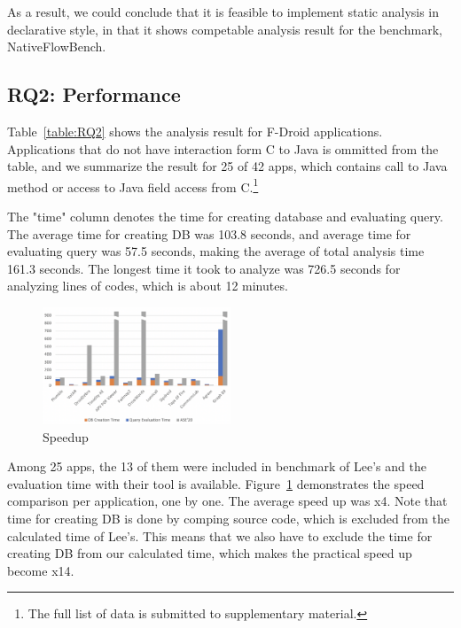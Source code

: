 As a result, we could conclude that it is feasible to implement static analysis
in declarative style, in that it shows competable analysis result for the
benchmark, NativeFlowBench.


\subsection{RQ2: Performance}

Table~\ref{table:RQ2} shows the analysis result for F-Droid applications.
Applications that do not have interaction form C to Java is ommitted from the
table, and we summarize the result for 25 of 42 apps, which contains call to
Java method or access to Java field access from C.\footnote{The full list of data
is submitted to supplementary material.}

The "time" column denotes the time for creating database and evaluating query.
The average time for creating DB was 103.8 seconds, and average time for
evaluating query was 57.5 seconds, making the average of total analysis time
161.3 seconds. The longest time it took to analyze was 726.5 seconds for
analyzing  lines of codes, which is about 12 minutes.

\begin{figure}[t]
  \centering
  \vspace{2mm}
  \includegraphics[width=0.5\textwidth]{img/graph}
  \vspace*{-1.5em}
  \caption{Speedup}
  \label{fig:graph}
\vspace*{-.5em}
\end{figure}

Among 25 apps, the 13 of them were included in benchmark of Lee's and the
evaluation time with their tool is available.  Figure~\ref{fig:graph}
demonstrates the speed comparison per application, one by one.  The average
speed up was x4. Note that time for creating DB is done by comping source code,
which is excluded from the calculated time of Lee's. This means that we also
have to exclude the time for creating DB from our calculated time, which makes
the practical speed up become x14.

